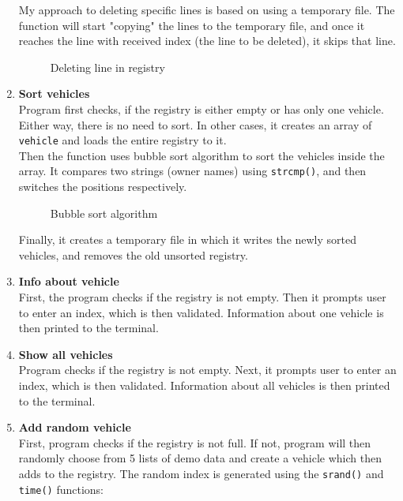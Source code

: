 \documentclass[12pt, a4paper, openright]{article}
\begin{document}
\begin{enumerate}
  My approach to deleting specific lines is based on using a temporary file. The function will start "copying" the lines to the temporary file, and once it reaches the line with received index (the line to be deleted), it skips that line.

    \begin{figure}[h!]
        \centering
        \caption{Deleting line in registry}
        \label{fig:placeholder}
    \end{figure}

  \item \textbf{Sort vehicles} \\
  Program first checks, if the registry is either empty or has only one vehicle. Either way, there is no need to sort. In other cases, it creates an array of \texttt{vehicle} and loads the entire registry to it. \\

  Then the function uses bubble sort algorithm to sort the vehicles inside the array. It compares two strings (owner names) using \texttt{strcmp()}, and then switches the positions respectively.

    \begin{figure}[h!]
        \centering
        \caption{Bubble sort algorithm}
        \label{fig:placeholder}
    \end{figure}

    Finally, it creates a temporary file in which it writes the newly sorted vehicles, and removes the old unsorted registry.

  \item \textbf{Info about vehicle} \\
  First, the program checks if the registry is not empty. Then it prompts user to enter an index, which is then validated. Information about one vehicle is then printed to the terminal.

  \item \textbf{Show all vehicles} \\
  Program checks if the registry is not empty. Next, it prompts user to enter an index, which is then validated. Information about all vehicles is then printed to the terminal.

  \item \textbf{Add random vehicle} \\
  First, program checks if the registry is not full. If not, program will then randomly choose from 5 lists of demo data and create a vehicle which then adds to the registry. The random index is generated using the \texttt{srand()} and \texttt{time()} functions:


\end{enumerate}
\end{document}
